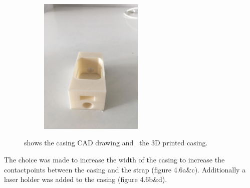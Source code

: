 \documentclass[whitelogo]{tudelft-report}
\begin{document}
{{{{\begin{figure}[htb]
\begin{subfigure}{0.45\linewidth}
		\centering\includegraphics[width=140pt]{casing/casing_box_front.jpeg}
		\caption{\label{fig:fig2}}
	\end{subfigure}  
	\caption{ shows the casing CAD drawing and~ the 3D printed casing.}
\end{figure}

The choice was made to increase the width of the casing to increase the contactpoints between the casing and the strap (figure 4.6a\&c). Additionally a laser holder was added to the casing (figure 4.6b&d).

}}}}
\end{document}
